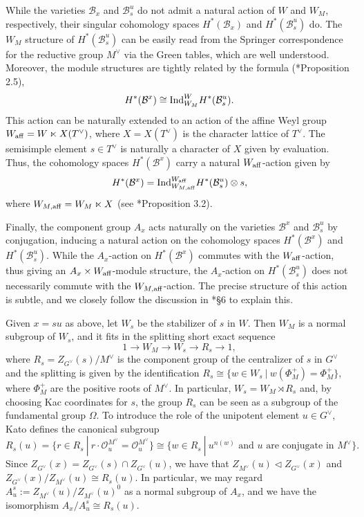While the varieties $\mathcal{B}_x$ and $\mathcal{B}_s^u$ do not admit a natural action of $W$ and $W_M$, respectively, their singular cohomology spaces $H^*(\mathcal{B}_x)$ and $H^*(\mathcal{B}_s^u)$ do. The $W_M$ structure of $H^*(\mathcal{B}_s^u)$ can be easily read from the Springer correspondence for the reductive group $M^\vee$ via the Green tables, which are well understood. Moreover, the module structures are tightly related by the formula (\cite{Kato1983}*{Proposition 2.5}),
$$H^*(\mathcal{B}^x)\cong\mathrm{Ind}_{W_M}^W H^*(\mathcal{B}_s^u).$$
This action can be naturally extended to an action of the affine Weyl group $W_{\mathrm{aff}}=W\ltimes X(T^\vee)$, where $X=X(T^\vee)$ is the character lattice of $T^\vee$. The semisimple element $s\in T^\vee$ is naturally a character of $X$ given by evaluation. Thus, the cohomology spaces $H^*(\mathcal{B}^x)$ carry a natural $W_{\mathrm{aff}}$-action given by 
$$H^*(\mathcal{B}^x)=\mathrm{Ind}_{W_{M,\mathrm{aff}}}^{W_{\mathrm{aff}}} H^*(\mathcal{B}_s^u)\otimes s,$$
where $W_{M,\mathrm{aff}}=W_M\ltimes X$ (see \cite{Kato1983}*{Proposition 3.2}).

Finally, the component group $A_x$ acts naturally on the varieties $\mathcal{B}^x$ and $\mathcal{B}^u_s$ by conjugation, inducing a natural action on the cohomology spaces $H^*(\mathcal{B}^x)$ and $H^*(\mathcal{B}_s^u)$. While the $A_x$-action on $H^*(\mathcal{B}^x)$ commutes with the $W_{\mathrm{aff}}$-action, thus giving an $A_x\times W_{\mathrm{aff}}$-module structure, the $A_x$-action on $H^*(\mathcal{B}_s^u)$ does not necessarily commute with the $W_{M,\mathrm{aff}}$-action. The precise structure of this action is subtle, and we closely follow the discussion in \cite{Kato1983}*{\S 6} to explain this.

Given $x=su$ as above, let $W_s$ be the stabilizer of $s$ in $W$. Then $W_M$ is a normal subgroup of $W_s$, and it fits in the splitting short exact sequence
$$1\longrightarrow W_M\longrightarrow W_s \longrightarrow R_s\longrightarrow 1,$$
where $R_s=Z_{G^\vee}(s)/M^\vee$ is the component group of the centralizer of $s$ in $G^\vee$ and the splitting is given by the identification $R_s\cong \{w\in W_s\ | \ w(\Phi_M^+)=\Phi_M^+\}$, where $\Phi_M^+$ are the positive roots of $M^\vee$. In particular, $W_s=W_M\rtimes R_s$ and, by choosing Kac coordinates for $s$, the group $R_s$ can be seen as a subgroup of the fundamental group $\Omega$. To introduce the role of the unipotent element $u\in G^\vee$, Kato defines the canonical subgroup 
$$R_s(u)=\{r\in R_s\ |\ r\cdot\mathcal{O}_u^{M^\vee}=\mathcal{O}_u^{M^\vee}\}\cong\{w\in R_s\ |\ u^{n(w)}\text{ and $u$ are conjugate in $M^\vee$}\}.$$
Since $Z_{G^\vee}(x)=Z_{G^\vee}(s)\cap Z_{G^\vee}(u)$, we have that $Z_{M^\vee}(u)\triangleleft Z_{G^\vee}(x)$ and $Z_{G^\vee}(x)/Z_{M^\vee}(u)\cong R_s(u)$. In particular, we may regard $A^s_u:=Z_{M^\vee}(u)/Z_{M^\vee}(u)^0$ as a normal subgroup of $A_x$, and we have the isomorphism $A_x/A^s_u\cong R_s(u)$. 


